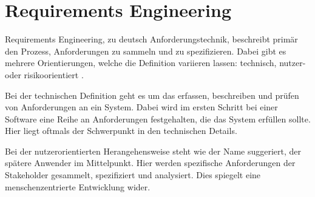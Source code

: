 

\section{Requirements Engineering}
Requirements Engineering, zu deutsch Anforderungstechnik, beschreibt primär den Prozess, Anforderungen zu sammeln und zu spezifizieren.
Dabei gibt es mehrere Orientierungen, welche die Definition variieren lassen: technisch, nutzer- oder risikoorientiert \cite{Sommerville.2012}.

Bei der technischen Definition geht es um das erfassen, beschreiben und prüfen von Anforderungen an ein System.
Dabei wird im ersten Schritt bei einer Software eine Reihe an Anforderungen festgehalten, die das System erfüllen sollte.
Hier liegt oftmals der Schwerpunkt in den technischen Details.

Bei der nutzerorientierten Herangehensweise steht wie der Name suggeriert, der spätere Anwender im Mittelpunkt. 
Hier werden spezifische Anforderungen der Stakeholder gesammelt, spezifiziert und analysiert.
Dies spiegelt eine menschenzentrierte Entwicklung wider.

